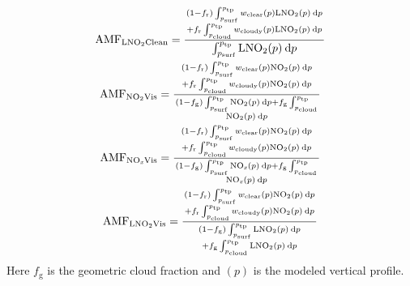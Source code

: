 \documentclass[amt]{copernicus}
\begin{document}
\begin{gather}
\mathrm{AMF}_{\chem{LNO_2}\mathrm{Clean}} = \displaystyle{{(1-f_\mathrm{r}) \int_{p_{\mathrm{surf}}}^{p_{\mathrm{tp}}} w_\mathrm{{clear}}(p) \chem{LNO_2}(p) \: \mathrm{d}p \atop+ f_\mathrm{r} \int_{p_\mathrm{{cloud}}}^{p_{\mathrm{tp}}} w_{\mathrm{cloudy}}(p) \chem{LNO_2}(p) \: \mathrm{d}p}\over{\int_{p_{\mathrm{surf}}}^{p_{\mathrm{tp}}} \chem{LNO_2}(p) \: \mathrm{d}p}}\\
\mathrm{AMF}_{\chem{NO_2}\mathrm{Vis}} = \displaystyle{{(1-f_\mathrm{r}) \int_{p_{\mathrm{surf}}}^{p_{\mathrm{tp}}} w_\mathrm{{clear}}(p) \chem{NO_2}(p) \: \mathrm{d}p \atop+ f_\mathrm{r} \int_{p_\mathrm{{cloud}}}^{p_{\mathrm{tp}}} w_{\mathrm{cloudy}}(p) \chem{NO_2}(p) \: \mathrm{d}p}\over{(1-f_\mathrm{g}) \int_{p_{\mathrm{surf}}}^{p_{\mathrm{tp}}} \chem{NO_2}(p) \: \mathrm{d}p + f_\mathrm{g} \int_{p_\mathrm{{cloud}}}^{p_{\mathrm{tp}}}\atop \chem{NO_2}(p) \: \mathrm{d}p}}\\
\mathrm{AMF}_{\chem{NO_\mathit{x}}\mathrm{Vis}} = \displaystyle{{(1-f_\mathrm{r}) \int_{p_{\mathrm{surf}}}^{p_{\mathrm{tp}}} w_\mathrm{{clear}}(p) \chem{NO_2}(p) \: \mathrm{d}p \atop+ f_\mathrm{r} \int_{p_\mathrm{{cloud}}}^{p_{\mathrm{tp}}} w_{\mathrm{cloudy}}(p) \chem{NO_2}(p) \: \mathrm{d}p}\over{(1-f_\mathrm{g}) \int_{p_{\mathrm{surf}}}^{p_{\mathrm{tp}}} \chem{NO_\mathit{x}}(p) \: \mathrm{d}p + f_\mathrm{g} \int_{p_\mathrm{{cloud}}}^{p_{\mathrm{tp}}} \atop\chem{NO_\mathit{x}}(p) \: \mathrm{d}p}}\\
\mathrm{AMF}_{\chem{LNO_2}\mathrm{Vis}} = \displaystyle{{(1-f_\mathrm{r}) \int_{p_{\mathrm{surf}}}^{p_{\mathrm{tp}}} w_\mathrm{{clear}}(p) \chem{NO_2}(p) \: \mathrm{d}p\atop + f_\mathrm{r} \int_{p_\mathrm{{cloud}}}^{p_{\mathrm{tp}}} w_{\mathrm{cloudy}}(p) \chem{NO_2}(p) \: \mathrm{d}p}\over{(1-f_\mathrm{g}) \int_{p_{\mathrm{surf}}}^{p_{\mathrm{tp}}} \chem{LNO_2}(p) \: \mathrm{d}p \atop+ f_\mathrm{g} \int_{p_\mathrm{{cloud}}}^{p_{\mathrm{tp}}} \chem{LNO_2}(p) \: \mathrm{d}p}}
\end{gather}
Here $f_\mathrm{g}$ is the geometric cloud fraction and $(p)$ is the modeled  vertical profile.
\end{document}
